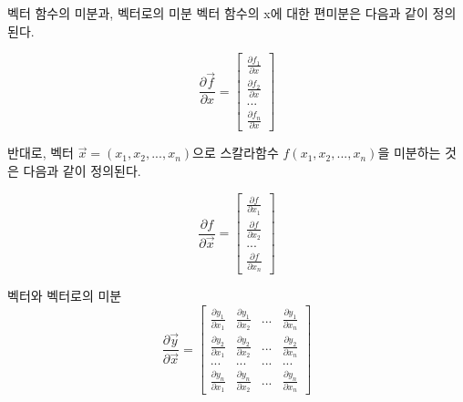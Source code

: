 \documentclass{beamer}
\begin{document}
\begin{frame}{벡터 함수의 미분과, 벡터로의 미분} 
벡터 함수의 x에 대한 편미분은 다음과 같이 정의된다. 

\begin{equation} 
\frac{\partial \vec{f}}{\partial x} = \left[ \begin{matrix} \frac{\partial f_1}{\partial x} \\ \frac{\partial f_2}{\partial x} \\ ... \\ \frac{\partial f_n}{\partial x} \end{matrix} \right]
\end{equation}

반대로, 벡터 $\vec{x} = (x_1, x_2, ..., x_n)$으로 스칼라함수 $f(x_1, x_2, ... , x_n)$을 미분하는 것은 다음과 같이 정의된다. 

\begin{equation} 
\frac{\partial f}{\partial \vec{x}} = \left[ \begin{matrix} \frac{\partial f}{\partial x_1} \\ \frac{\partial f}{\partial x_2} \\ ... \\ \frac{\partial f}{\partial x_n} \end{matrix} \right]
\end{equation}

\end{frame}

\begin{frame}{벡터와 벡터로의 미분}
\begin{equation} 
\frac{\partial \vec{y}}{\partial \vec{x}} = \left[ \begin{matrix} 
\frac{\partial y_1}{\partial x_1} & \frac{\partial y_1}{\partial x_2} & ... & \frac{\partial y_1}{\partial x_n} \\ 
\frac{\partial y_2}{\partial x_1} & \frac{\partial y_2}{\partial x_2} & ... & \frac{\partial y_2}{\partial x_n} \\ 
... & ... & ... & ... \\
\frac{\partial y_n}{\partial x_1} & \frac{\partial y_n}{\partial x_2} & ... & \frac{\partial y_n}{\partial x_n} \end{matrix} \right]
\end{equation}
\end{frame}
\end{document}
